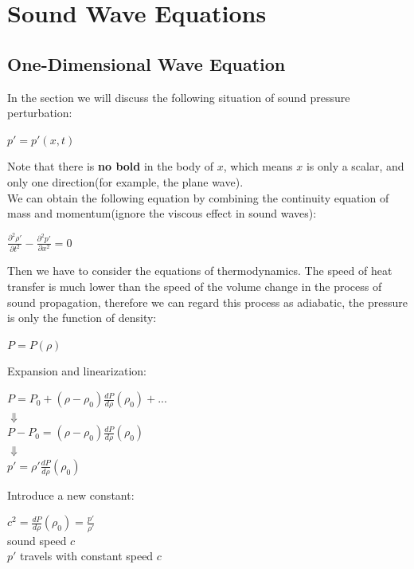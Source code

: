 \documentclass[graybox]{svmult}
\begin{document}
\section{Sound Wave Equations}
\label{sec:2}

\subsection{One-Dimensional Wave Equation}
\label{subsec:2}
In the section we will discuss the following situation of sound pressure perturbation:
\begin{center}
    $ p'=p'(x,t)$
\end{center}
Note that there is \textbf{ no bold} in the body of $ x $, which means $ x $ is only a scalar, and only one direction(for example, the plane wave). \\

We can obtain the following equation by combining the continuity equation of mass and momentum(ignore the viscous effect in sound waves):
\begin{center}
    $ \frac{\partial^2 \rho'}{\partial t^2} - \frac{\partial^2 p'}{\partial x^2} = 0 $
\end{center}

Then we have to consider the equations of thermodynamics. The speed of heat transfer is much lower than the speed of the volume change in the process of sound propagation, therefore we can regard this process as adiabatic, the pressure is only the function of density:
\begin{center}
    $ P=P(\rho)$
\end{center}

Expansion and linearization:
\begin{center}
    $ P=P_0 + (\rho - \rho_0)\frac{dP}{d\rho}(\rho_0) + ... $ \\
    $ \Downarrow $ \\ 
    $ P-P_0 = (\rho - \rho_0)\frac{dP}{d\rho}(\rho_0)$ \\
    $ \Downarrow $ \\ 
    $ p' = \rho'\frac{dP}{d\rho}(\rho_0)$
\end{center}

Introduce a new constant:
\begin{center}
    $ c^2 = \frac{dP}{d\rho}(\rho_0) = \frac{p'}{\rho'}$\\
    sound speed $ c $ \\
    $ p'$ travels with constant speed $ c $
\end{center}
\end{document}
